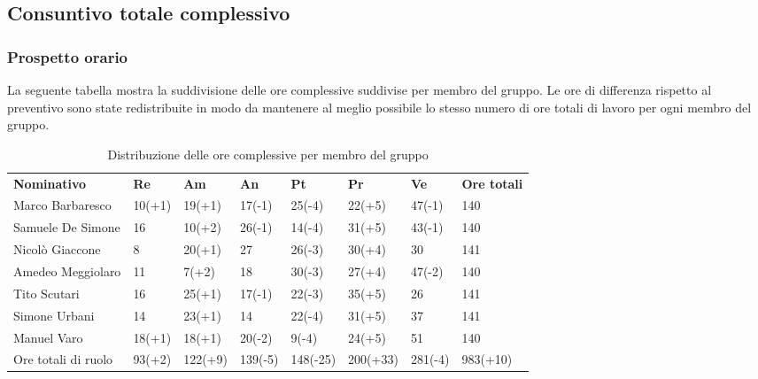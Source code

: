 \pagebreak
\subsection{Consuntivo totale complessivo}
\subsubsection{Prospetto orario}
La seguente tabella mostra la suddivisione delle ore complessive suddivise per membro del gruppo. Le ore di differenza rispetto al preventivo sono state redistribuite in modo da mantenere al meglio possibile lo stesso numero di ore totali di lavoro per ogni membro del gruppo.
\begin{center}
    \begin{table}[ht!]
        \centering
        \caption{Distribuzione delle ore complessive per membro del gruppo}
        \vspace{5px}
        \renewcommand{\arraystretch}{1.8}
        \begin{tabular}{p{100px} p{30px} p{30px} p{35px} p{40px} p{40px} p{35px} p{50px} }
            \rowcolor{logo!70} \textbf{Nominativo} & \textbf{Re} & \textbf{Am} & \textbf{An} & \textbf{Pt} & \textbf{Pr} & \textbf{Ve} & \textbf{Ore totali} \\
            Marco Barbaresco                       & 10(+1)      & 19(+1)          & 17(-1)      & 25(-4)      & 22(+5)      & 47(-1)      & 140                 \\
            Samuele De Simone                      & 16          & 10(+2)          & 26(-1)      & 14(-4)      & 31(+5)      & 43(-1)      & 140                 \\
            Nicolò Giaccone                        & 8           & 20(+1)          & 27          & 26(-3)      & 30(+4)      & 30          & 141                 \\
            Amedeo Meggiolaro                      & 11          & 7(+2)           & 18          & 30(-3)      & 27(+4)      & 47(-2)      & 140                 \\
            Tito Scutari                           & 16          & 25(+1)          & 17(-1)      & 22(-3)      & 35(+5)      & 26          & 141                 \\
            Simone Urbani                          & 14          & 23(+1)          & 14          & 22(-4)      & 31(+5)      & 37          & 141                 \\
            Manuel Varo                            & 18(+1)      & 18(+1)          & 20(-2)      & 9(-4)       & 24(+5)      & 51          & 140                 \\
            Ore totali di ruolo                    & 93(+2)      & 122(+9)         & 139(-5)     & 148(-25)    & 200(+33)    & 281(-4)     & 983(+10)            \\
        \end{tabular}
    \end{table}
\end{center}

